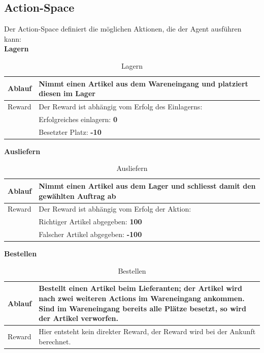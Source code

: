 \newpage
\subsection{Action-Space}
Der Action-Space definiert die möglichen Aktionen, die der Agent ausführen kann: \\
\noindent\textbf{Lagern}
\begin{table}[H]%
\begin{tabularx}{\textwidth} { 
  | >{\raggedright\arraybackslash}l 
  | >{\raggedright\arraybackslash}X|}
 \hline
  Ablauf &Nimmt einen Artikel aus dem Wareneingang und platziert diesen im Lager\\
\hline
 Reward &Der Reward ist abhängig vom Erfolg des Einlagerns:\\
&Erfolgreiches einlagern: \textbf{0}\\
&Besetzter Platz: \textbf{-10}\\
 \hline
\end{tabularx}
\caption{Lagern}
\end{table}%

\noindent\textbf{Ausliefern}
\begin{table}[H]%
\begin{tabularx}{\textwidth} { 
  | >{\raggedright\arraybackslash}l 
  | >{\raggedright\arraybackslash}X|}
 \hline
  Ablauf &Nimmt einen Artikel aus dem Lager und schliesst damit den gewählten Auftrag ab\\
\hline
 Reward &Der Reward ist abhängig vom Erfolg der Aktion:\\
&Richtiger Artikel abgegeben: \textbf{100}\\
&Falscher Artikel abgegeben: \textbf{-100}\\
 \hline
\end{tabularx}
\caption{Ausliefern}
\end{table}%

\noindent\textbf{Bestellen}
\begin{table}[H]%
\begin{tabularx}{\textwidth} { 
  | >{\raggedright\arraybackslash}l 
  | >{\raggedright\arraybackslash}X|}
 \hline
  Ablauf &Bestellt einen Artikel beim Lieferanten; der Artikel wird nach zwei weiteren Actions im Wareneingang ankommen. Sind im Wareneingang bereits alle Plätze besetzt, so wird der Artikel verworfen.\\
\hline
 Reward &Hier entsteht kein direkter Reward, der Reward wird bei der Ankunft berechnet.\\
 \hline
\end{tabularx}
\caption{Bestellen}
\end{table}%

